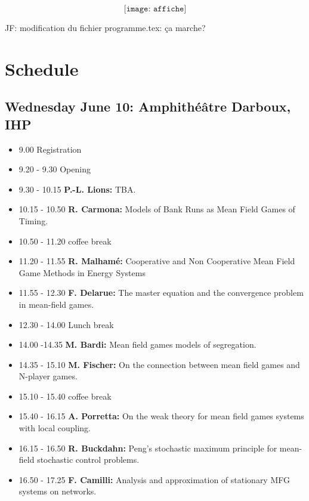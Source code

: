 \documentclass[11pt]{article}
\begin{document}
\[
\texttt{[image: affiche]}
\]
\vfill\eject

JF: modification du fichier programme.tex: ça marche?   


\section*{Schedule}

\subsection*{Wednesday June  10: Amphith{\'e}{\^a}tre Darboux, IHP}
\begin{itemize}
\item 9.00  Registration 
\item 9.20 - 9.30  Opening
\item 9.30 - 10.15  {\bf P.-L. Lions:}  TBA.
\item 10.15 - 10.50  {\bf R. Carmona:}  Models of Bank Runs as Mean Field Games of Timing. 
\item 10.50 - 11.20   coffee break
\item 11.20 - 11.55  {\bf R. Malham{\' e}:}   Cooperative and Non Cooperative Mean Field Game Methods in Energy Systems 
\item 11.55 - 12.30  {\bf F. Delarue:}  The master equation and the convergence problem in mean-field games.
\item 12.30 - 14.00  Lunch break
\item 14.00 -14.35 {\bf  M. Bardi:} Mean field games models of segregation.
\item 14.35 - 15.10 {\bf M. Fischer:} On the connection between mean field games and N-player games. 
\item 15.10 - 15.40  coffee break
\item 15.40 - 16.15  {\bf  A. Porretta:} On the weak theory for mean field games systems with local coupling. 
\item 16.15 - 16.50 {\bf  R. Buckdahn:} Peng's stochastic maximum principle for mean-field stochastic control problems. 
\item 16.50 - 17.25 {\bf  F. Camilli:} Analysis and approximation of   stationary MFG systems  on  networks.
\end{itemize}
\vfill\eject
\end{document}

